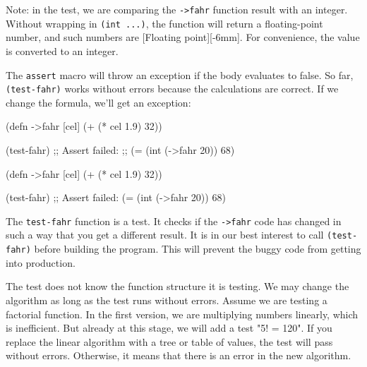 
Note: in the test, we are comparing the \verb|->fahr| function result with an integer. Without wrapping in \verb|(int ...)|, the function will return a floating-point number, and such numbers are [Floating point][-6mm]. For convenience, the value is converted to an integer.

The \verb|assert| macro will throw an exception if the body evaluates to false. So far, \verb|(test-fahr)| works without errors because the calculations are correct. If we change the formula, we'll get an exception:

\ifx\DEVICETYPE\MOBILE

\begin{english}
  \begin{clojure}
(defn ->fahr [cel]
  (+ (* cel 1.9) 32))

(test-fahr)
;; Assert failed:
;; (= (int (->fahr 20)) 68)
  \end{clojure}
\end{english}

\else

\begin{english}
  \begin{clojure}
(defn ->fahr [cel]
  (+ (* cel 1.9) 32))

(test-fahr)
;; Assert failed: (= (int (->fahr 20)) 68)
  \end{clojure}
\end{english}

\fi

The \verb|test-fahr| function is a test. It checks if the \verb|->fahr| code has changed in such a way that you get a different result. It is in our best interest to call \verb|(test-fahr)| before building the program. This will prevent the buggy code from getting into production.


The test does not know the function structure it is testing. We may change the algorithm as long as the test runs without errors. Assume we are testing a factorial function. In the first version, we are multiplying numbers linearly, which is inefficient. But already at this stage, we will add a test "5! = 120". If you replace the linear algorithm with a tree or table of values, the test will pass without errors. Otherwise, it means that there is an error in the new algorithm.

